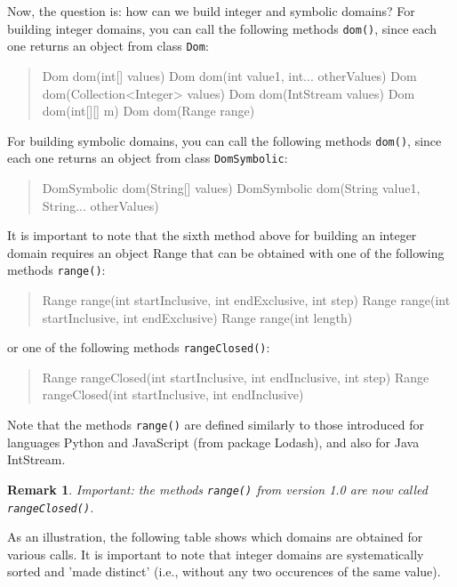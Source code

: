 \documentclass[10pt]{article}
\newtheorem{remark}{Remark}
\newcommand{\nn}[1]{{\tt #1}} %
\newenvironment{myvb}{\endgraf\small\verbatim}{\endverbatim}
\begin{document}
Now, the question is: how can we build integer and symbolic domains? %
For building integer domains, you can call the following methods \nn{dom()}, since each one returns an object from class \nn{Dom}: 
\begin{quote}
\begin{myvb}
Dom dom(int[] values)
Dom dom(int value1, int... otherValues) 
Dom dom(Collection<Integer> values)
Dom dom(IntStream values) 
Dom dom(int[][] m) 
Dom dom(Range range) 
\end{myvb}
\end{quote}

For building symbolic domains, you can call the following methods \nn{dom()}, since each one returns an object from class \nn{DomSymbolic}: 
\begin{quote}
\begin{myvb}
DomSymbolic dom(String[] values)
DomSymbolic dom(String value1, String... otherValues) 
\end{myvb}
\end{quote}

It is important to note that the sixth method above for building an integer domain requires an object Range that can be obtained with one of the following methods \nn{range()}: 
\begin{quote}
\begin{myvb}
Range range(int startInclusive, int endExclusive, int step) 
Range range(int startInclusive, int endExclusive) 
Range range(int length) 
\end{myvb}
\end{quote}
or one of the following methods \nn{rangeClosed()}: 
\begin{quote}
\begin{myvb}
Range rangeClosed(int startInclusive, int endInclusive, int step) 
Range rangeClosed(int startInclusive, int endInclusive) 
\end{myvb}
\end{quote}

Note that the methods \nn{range()} are defined similarly to those introduced for languages Python and JavaScript (from package Lodash), and also for Java IntStream.

\begin{remark}
  Important: the methods \nn{range()} from version 1.0 are now called \nn{rangeClosed()}.
\end{remark}
  
As an illustration, the following table shows which domains are obtained for various calls.
It is important to note that integer domains are systematically sorted and 'made distinct' (i.e., without any two occurences of the same value).
\end{document}
